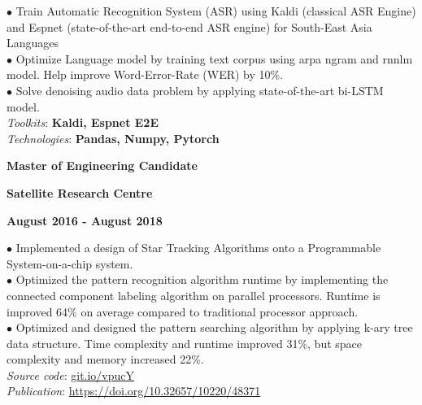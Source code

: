 \documentclass[10pt]{article}
\begin{document}
        \vspace{-5mm}
        $\bullet$ {Train Automatic Recognition System (ASR) using Kaldi (classical ASR Engine) and Espnet (state-of-the-art end-to-end ASR engine) for South-East Asia Languages} \\
        $\bullet$ {Optimize Language model by training text corpus using arpa ngram and rnnlm model. Help improve Word-Error-Rate (WER) by 10\%.} \\
        $\bullet$ {Solve denoising audio data problem by applying state-of-the-art bi-LSTM model.} \\
        \emph{Toolkits}: \textbf{Kaldi, Espnet E2E} \\
        \emph{Technologies}: \textbf{Pandas, Numpy, Pytorch}


        \begin{multicols}{3}
            \begin{flushleft}
                \textbf{Master of Engineering Candidate}
            \end{flushleft}

            \columnbreak

            \begin{center}
                \textbf{Satellite Research Centre}
            \end{center}

            \columnbreak

            \begin{flushright}
                \textbf{August 2016 - August 2018}
            \end{flushright}
        \end{multicols}

        \vspace{-5mm}

        $\bullet$ {Implemented a design of Star Tracking Algorithms onto a Programmable System-on-a-chip system. }\\
        $\bullet$ {Optimized the pattern recognition algorithm runtime by implementing the connected component labeling algorithm on parallel processors. Runtime is improved 64\% on average compared to traditional processor approach.} \\
        $\bullet$ {Optimized and designed the pattern searching algorithm by applying k-ary tree data structure. Time complexity and runtime improved 31\%, but space complexity and memory increased 22\%.} \\
        \emph{Source code}: \href{https://git.io/vpucY}{git.io/vpucY} \\
        \emph{Publication}: \href{https://doi.org/10.32657/10220/48371}{https://doi.org/10.32657/10220/48371}
\end{document}
